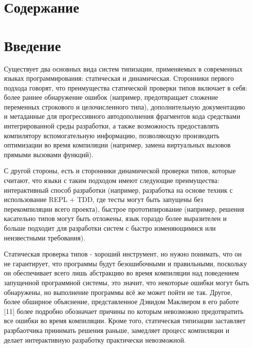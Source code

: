 \documentclass[a4paper,14pt]{extreport}
\begin{document}
\newpage

\chapter*{Содержание}


\chapter*{Введение}

Существует два основных вида систем типизации, применяемых в современных языках
программирования: статическая и динамическая. Сторонники первого подхода
говорят, что преимущества статической проверки типов включает в себя: более
раннее обнаружение ошибок (например, предотвращает сложение переменных
строкового и целочисленного типа), дополнительную документацию и метаданные для
прогрессивного автодополнения фрагментов кода средствами интегрированной среды
разработки, а также возможность предоставлять компилятору вспомогательную
информацию, позволяющую производить оптимизации во время компиляции (например,
замена виртуальных вызовов прямыми вызовами функций).

С другой стороны, есть и сторонники динамической проверки типов, которые
считают, что языки с таким подходом имеют следующие преимущества: интерактивный
способ разработки (например, разработка на основе техник с использование REPL +
TDD, где тесты могут быть запущены без перекомпиляции всего проекта), быстрое
прототипирование (например, решения касательно типов могут быть отложены, язык
гораздо более выразителен и больше подходит для разработки систем с быстро
изменяющимися или неизвестными требования).

Статическая проверка типов - хороший инструмент, но нужно понимать, что он не
гарантирует, что программы будут безошибочными и правильными, поскольку он
обеспечивает всего лишь абстракцию во время компиляции над поведением запущенной
программной системы, это значит, что некоторые ошибки могут быть обнаружены, но
выполнение программы всё же может пойти не так. Другое, более обширное
объяснение, представленное Дэвидом Маклвером в его работе [11] более подробно
обозначает причины по которым невозможно предотвратить все ошибки во время
компиляции. Кроме того, статическая типизации заставляет разрбаотчика принимать
решения раньше, замедляет процесс компиляции и делает интерактивную разработку
практически невозможной.
\end{document}
